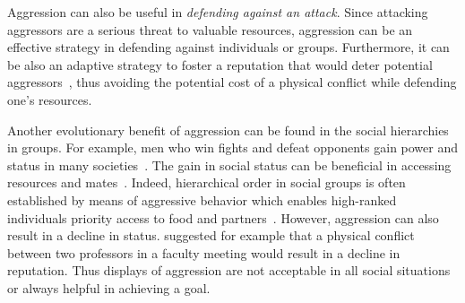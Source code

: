 Aggression can also be useful in \textit{defending against an attack}.
Since attacking aggressors are a serious threat to valuable resources,
aggression can be an effective strategy in defending against individuals or groups.
Furthermore, it can be also an adaptive strategy to foster a reputation that would deter potential aggressors~\cite{Buss1997},
thus avoiding the potential cost of a physical conflict while defending one's resources.

Another evolutionary benefit of aggression can be found in the social hierarchies in groups.
For example, men who win fights and defeat opponents gain power and status in many societies~\cite{Hill1996}.
The gain in social status can be beneficial in accessing resources and mates~\cite{Archer2009}.
Indeed, hierarchical order in social groups is often established by means of aggressive behavior which enables high-ranked individuals priority access to food and partners~\cite{Lindenfors2011}. 
However, aggression can also result in a decline in status.
\citet{Buss1997} suggested for example that a physical conflict between two professors in a faculty meeting would result in a decline in reputation.
Thus displays of aggression are not acceptable in all social situations or always helpful in achieving a goal.

